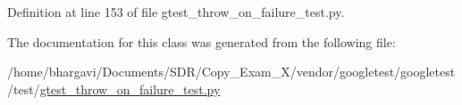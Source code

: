 Definition at line 153 of file gtest\+\_\+throw\+\_\+on\+\_\+failure\+\_\+test.\+py.



The documentation for this class was generated from the following file\+:\begin{DoxyCompactItemize}
\item 
/home/bhargavi/\+Documents/\+S\+D\+R/\+Copy\+\_\+\+Exam\+\_\+X/vendor/googletest/googletest/test/\hyperlink{gtest__throw__on__failure__test_8py}{gtest\+\_\+throw\+\_\+on\+\_\+failure\+\_\+test.\+py}\end{DoxyCompactItemize}
